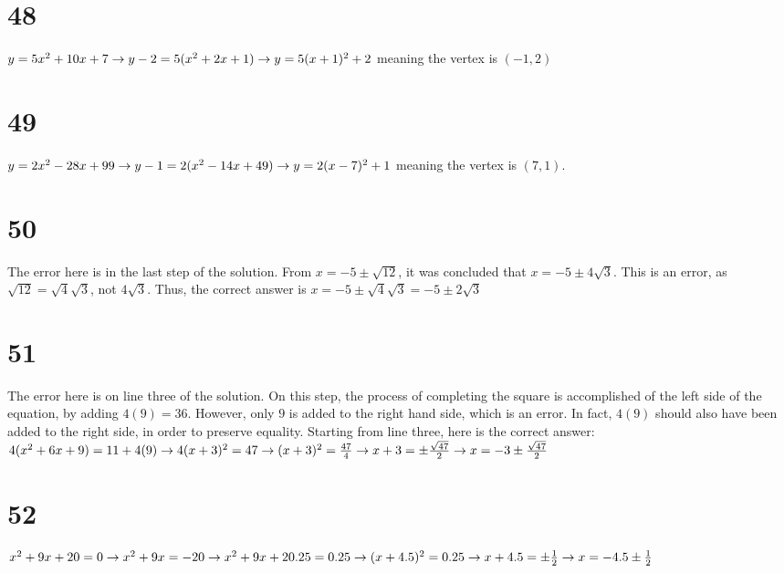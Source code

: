 \documentclass{article}
\theoremstyle{definition}
\begin{document}
\section*{48}
$y=5x^2+10x+7\newline\rightarrow y-2=5(x^2+2x+1)\newline\rightarrow y=5(x+1)^2+2$ meaning the vertex is $(-1,2)$ 

\section*{49}
$y=2x^2-28x+99\newline\rightarrow y-1=2(x^2-14x+49)\newline\rightarrow y=2(x-7)^2+1$ meaning the vertex is $(7,1)$.

\section*{50}
The error here is in the last step of the solution. From $x=-5\pm \sqrt{12}$, it was concluded that $x=-5\pm 4\sqrt{3}$. This is an error, as $\sqrt{12} =
\sqrt{4}\sqrt{3}$, not $4\sqrt{3}$. Thus, the correct answer is $x=-5\pm \sqrt{4}\sqrt{3}=-5\pm 2\sqrt{3}$

\section*{51}
The error here is on line three of the solution. On this step, the process of completing the square is accomplished of the left side of the equation, 
by adding $4(9)=36$. However, only $9$ is added to the right hand side, which is an error. In fact, $4(9)$ should also have been added to the right side, 
in order to preserve equality. Starting from line three, here is the correct answer:\newline $4(x^2+6x+9)=11+4(9)\newline\rightarrow 
4(x+3)^2=47\newline\rightarrow (x+3)^2=\frac{47}{4}\newline\rightarrow x+3=\pm\frac{\sqrt{47}}{2}\newline\rightarrow x=-3\pm\frac{\sqrt{47}}{2}$

\section*{52}
$x^2+9x+20=0\newline\rightarrow x^2+9x=-20\newline\rightarrow x^2+9x+20.25=0.25\newline\rightarrow (x+4.5)^2=0.25\newline\rightarrow 
x+4.5=\pm\frac{1}{2}\newline\rightarrow x=-4.5\pm\frac{1}{2}$
\end{document}
